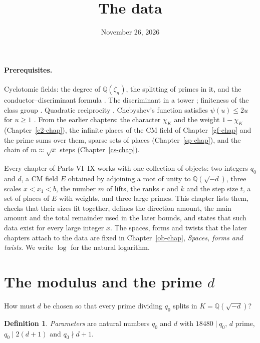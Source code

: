 \documentclass[reqno]{amsart}
\title{The data}
\author{}
\date{November 26, 2026}
\newcounter{chap}
\theoremstyle{plain}
\theoremstyle{definition}
\newtheorem{definition}[theorem]{Definition}
\newcommand{\Q}{{\mathbb{Q}}}
\begin{document}
\maketitle
{}\label{chap}

\paragraph{Prerequisites.}
Cyclotomic fields: the degree of \(\Q(\zeta_n)\), the splitting of primes in it, and the conductor--discriminant formula \cite[Ch.~2--3]{Wa}.  The discriminant in a tower \cite[Ch.~III, \S2]{Ne}; finiteness of the class group \cite[Ch.~I, \S6]{Ne}.  Quadratic reciprocity \cite[Ch.~5]{IR}.  Chebyshev's function satisfies \(\psi(u) \le 2u\) for \(u \ge 1\) \cite[Thm.~12]{RS}.  From the earlier chapters: the character \(\chi_K\) and the weight \(1 - \chi_K\) (Chapter~\ref{c2-chap}), the infinite places of the CM field of Chapter~\ref{gf-chap} and the prime sums over them, sparse sets of places (Chapter~\ref{sp-chap}), and the chain of \(m \approx \sqrt x\) steps (Chapter~\ref{cs-chap}).

\medskip
Every chapter of Parts VI--IX works with one collection of objects: two integers \(q_0\) and \(d\), a CM field \(E\) obtained by adjoining a root of unity to \(\Q(\sqrt{-d})\), three scales \(x < x_1 < b\), the number \(m\) of lifts, the ranks \(r\) and \(k\) and the step size \(t\), a set of places of \(E\) with weights, and three large primes.  This chapter lists them, checks that their sizes fit together, defines the direction amount, the main amount and the total remainder used in the later bounds, and states that such data exist for every large integer \(x\).  The spaces, forms and twists that the later chapters attach to the data are fixed in Chapter~\ref{ob-chap}, \emph{Spaces, forms and twists}.  We write \(\log\) for the natural logarithm.

\section{The modulus and the prime \texorpdfstring{\(d\)}{d}}\label{sec:parameters}

How must \(d\) be chosen so that every prime dividing \(q_0\) splits in \(K = \Q(\sqrt{-d})\)?

\begin{definition}\label{def:parameters}
\emph{Parameters} are natural numbers \(q_0\) and \(d\) with \(18480 \mid q_0\), \(d\) prime, \(q_0 \mid 2(d+1)\) and \(q_0 \nmid d + 1\).
\end{definition}
\end{document}
